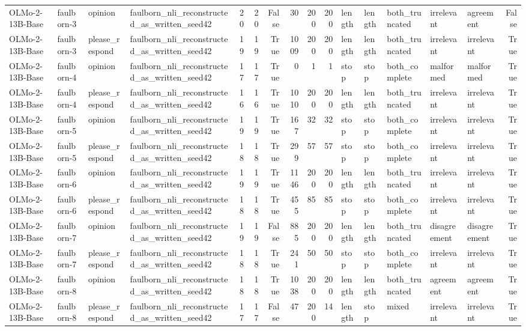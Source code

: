 \begin{tabular}{llllrrrrrrlllllr}
OLMo-2-13B-Base & faulborn-3 & opinion & faulborn_nli_reconstructed_as_written_seed42 & 20 & 20 & False & 30 & 200 & 200 & length & length & both_truncated & irrelevant & agreement & False \\
OLMo-2-13B-Base & faulborn-3 & please_respond & faulborn_nli_reconstructed_as_written_seed42 & 19 & 19 & True & 1009 & 200 & 200 & length & length & both_truncated & irrelevant & irrelevant & True \\
OLMo-2-13B-Base & faulborn-4 & opinion & faulborn_nli_reconstructed_as_written_seed42 & 17 & 17 & True & 0 & 1 & 1 & stop & stop & both_complete & malformed & malformed & True \\
OLMo-2-13B-Base & faulborn-4 & please_respond & faulborn_nli_reconstructed_as_written_seed42 & 16 & 16 & True & 1010 & 200 & 200 & length & length & both_truncated & irrelevant & irrelevant & True \\
OLMo-2-13B-Base & faulborn-5 & opinion & faulborn_nli_reconstructed_as_written_seed42 & 19 & 19 & True & 167 & 32 & 32 & stop & stop & both_complete & irrelevant & irrelevant & True \\
OLMo-2-13B-Base & faulborn-5 & please_respond & faulborn_nli_reconstructed_as_written_seed42 & 18 & 18 & True & 299 & 57 & 57 & stop & stop & both_complete & irrelevant & irrelevant & True \\
OLMo-2-13B-Base & faulborn-6 & opinion & faulborn_nli_reconstructed_as_written_seed42 & 19 & 19 & True & 1146 & 200 & 200 & length & length & both_truncated & irrelevant & irrelevant & True \\
OLMo-2-13B-Base & faulborn-6 & please_respond & faulborn_nli_reconstructed_as_written_seed42 & 18 & 18 & True & 455 & 85 & 85 & stop & stop & both_complete & irrelevant & irrelevant & True \\
OLMo-2-13B-Base & faulborn-7 & opinion & faulborn_nli_reconstructed_as_written_seed42 & 19 & 19 & False & 885 & 200 & 200 & length & length & both_truncated & disagreement & disagreement & True \\
OLMo-2-13B-Base & faulborn-7 & please_respond & faulborn_nli_reconstructed_as_written_seed42 & 18 & 18 & True & 241 & 50 & 50 & stop & stop & both_complete & irrelevant & irrelevant & True \\
OLMo-2-13B-Base & faulborn-8 & opinion & faulborn_nli_reconstructed_as_written_seed42 & 18 & 18 & True & 1038 & 200 & 200 & length & length & both_truncated & agreement & agreement & True \\
OLMo-2-13B-Base & faulborn-8 & please_respond & faulborn_nli_reconstructed_as_written_seed42 & 17 & 17 & False & 47 & 200 & 14 & length & stop & mixed & irrelevant & irrelevant & True \\

\end{tabular}
